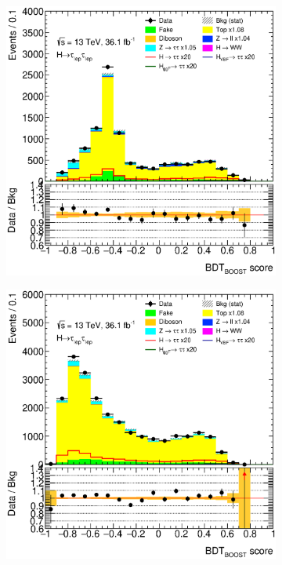\begin{figure}[htb]
\begin{subfigure}[t]{0.45\textwidth}
    \end{subfigure}
    \begin{subfigure}[t]{0.45\textwidth}
        \includegraphics[width=\textwidth]{./plots/mva/modeling/BDT/CRs/eemm-CutMVABoostedCatTopCR-BDT_BOOST_CR-lin.eps}
    \end{subfigure}
    \begin{subfigure}[t]{0.45\textwidth}
        \includegraphics[width=\textwidth]{./plots/mva/modeling/BDT/CRs/emme-CutMVABoostedCatTopCR-BDT_BOOST_CR-lin.eps}

\end{subfigure}
\end{figure}
